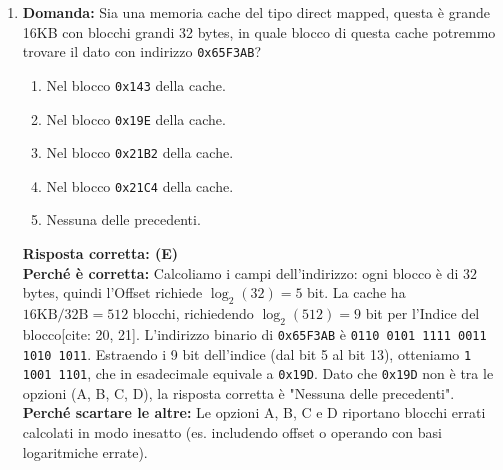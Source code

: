 \documentclass[12pt, a4paper]{article}
\begin{document}
\begin{enumerate}
    \item \textbf{Domanda:} Sia una memoria cache del tipo direct mapped, questa è grande 16KB con blocchi grandi 32 bytes, in quale blocco di questa cache potremmo trovare il dato con indirizzo \texttt{0x65F3AB}?
    \begin{enumerate}[label=(\Alph*)]
        \item Nel blocco \texttt{0x143} della cache.
        \item Nel blocco \texttt{0x19E} della cache.
        \item Nel blocco \texttt{0x21B2} della cache.
        \item Nel blocco \texttt{0x21C4} della cache.
        \item Nessuna delle precedenti.
    \end{enumerate}
    \textbf{Risposta corretta: (E)} \\
    \textbf{Perché è corretta:} Calcoliamo i campi dell'indirizzo: ogni blocco è di $32$ bytes, quindi l'Offset richiede $\log_2(32) = 5$ bit. La cache ha $16\text{KB} / 32\text{B} = 512$ blocchi, richiedendo $\log_2(512) = 9$ bit per l'Indice del blocco[cite: 20, 21]. L'indirizzo binario di \texttt{0x65F3AB} è \texttt{0110 0101 1111 0011 1010 1011}. Estraendo i 9 bit dell'indice (dal bit 5 al bit 13), otteniamo \texttt{1 1001 1101}, che in esadecimale equivale a \texttt{0x19D}. Dato che \texttt{0x19D} non è tra le opzioni (A, B, C, D), la risposta corretta è "Nessuna delle precedenti". \\
    \textbf{Perché scartare le altre:} Le opzioni A, B, C e D riportano blocchi errati calcolati in modo inesatto (es. includendo offset o operando con basi logaritmiche errate).

\newpage


\end{enumerate}
\end{document}
